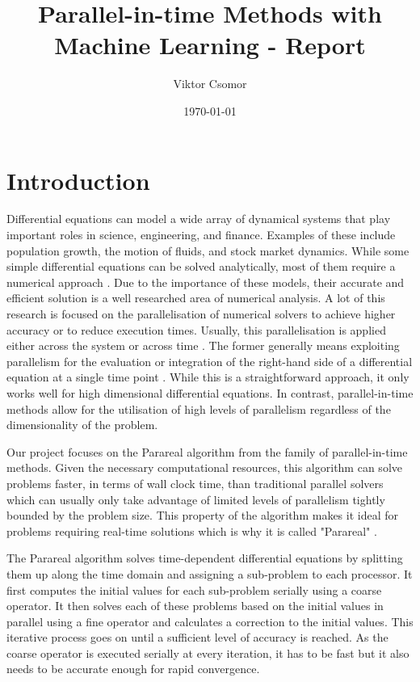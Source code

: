 \documentclass{article}
\begin{document}

\title{Parallel-in-time Methods with Machine Learning - Report}
\author{Viktor Csomor}
\date{\today}

\makeEPCCtitle

\newpage

\tableofcontents

\newpage
{}

\section{Introduction}

Differential equations can model a wide array of dynamical systems that play important roles in science, engineering, and finance. Examples of these include population growth, the motion of fluids, and stock market dynamics. While some simple differential equations can be solved analytically, most of them require a numerical approach \cite[p.~310]{suli2003}. Due to the importance of these models, their accurate and efficient solution is a well researched area of numerical analysis. A lot of this research is focused on the parallelisation of numerical solvers to achieve higher accuracy or to reduce execution times. Usually, this parallelisation is applied either across the system or across time \cite{gear1988}. The former generally means exploiting parallelism for the evaluation or integration of the right-hand side of a differential equation at a single time point \cite[p.~1-2]{solodushkin2016}. While this is a straightforward approach, it only works well for high dimensional differential equations. In contrast, parallel-in-time methods allow for the utilisation of high levels of parallelism regardless of the dimensionality of the problem.

Our project focuses on the Parareal algorithm \cite{staff2003} from the family of parallel-in-time methods. Given the necessary computational resources, this algorithm can solve problems faster, in terms of wall clock time, than traditional parallel solvers which can usually only take advantage of limited levels of parallelism tightly bounded by the problem size. This property of the algorithm makes it ideal for problems requiring real-time solutions which is why it is called "Parareal" \cite[p.~3]{staff2003}.

The Parareal algorithm solves time-dependent differential equations by splitting them up along the time domain and assigning a sub-problem to each processor. It first computes the initial values for each sub-problem serially using a coarse operator. It then solves each of these problems based on the initial values in parallel using a fine operator and calculates a correction to the initial values. This iterative process goes on until a sufficient level of accuracy is reached. As the coarse operator is executed serially at every iteration, it has to be fast but it also needs to be accurate enough for rapid convergence.
\end{document}
